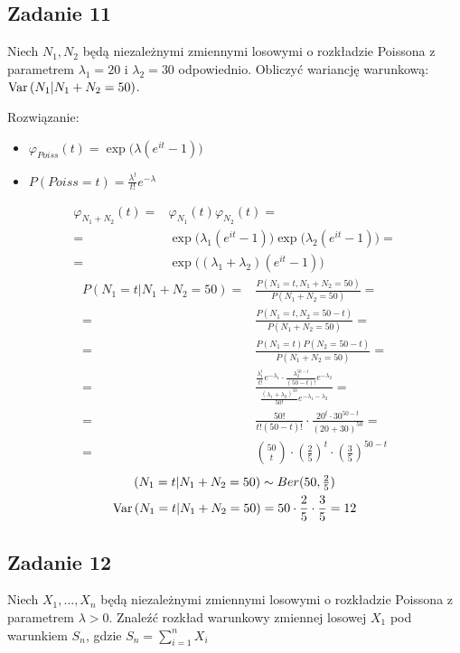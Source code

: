 \subsection*{Zadanie 11}
Niech $ N_1,N_2 $ będą niezależnymi zmiennymi losowymi o rozkładzie Poissona z parametrem $ \lambda_1=20$ i $ \lambda_2=30 $ odpowiednio. Obliczyć wariancję warunkową: $ \text{Var}\left(N_1|N_1+N_2=50\right) $.

Rozwiązanie:
\begin{itemize}
\item $ \varphi_{Poiss}(t)=\exp \bigl(\lambda(e^{it}-1)\bigr) $
\item $ P\left(Poiss=t\right)=\frac{\lambda^t}{t!}e^{-\lambda} $
\end{itemize}
\begin{align*}
\varphi_{N_1+N_2}(t)
=&
\varphi_{N_1}(t)\varphi_{N_2}(t)
=\\=&
\exp \bigl(\lambda_1(e^{it}-1)\bigr)\exp \bigl(\lambda_2(e^{it}-1)\bigr)
=\\=&
\exp \bigl(\left(\lambda_1+\lambda_2\right)(e^{it}-1)\bigr)
\end{align*}
\begin{align*}
P \left(N_1=t|N_1+N_2=50\right)
=&
\frac{P\left(N_1=t,N_1+N_2=50\right)}{P\left(N_1+N_2=50\right)}
=\\=&
\frac{P\left(N_1=t,N_2=50-t\right)}{P\left(N_1+N_2=50\right)}
=\\=&
\frac{P\left(N_1=t\right) P\left(N_2=50-t\right)}{P\left(N_1+N_2=50\right)}
=\\=&
\frac{\frac{\lambda_1^t}{t!}e^{-\lambda_1}
\cdot
\frac{\lambda_2^{50-t}}{(50-t)!}e^{-\lambda_2}}{\frac{(\lambda_1+\lambda_2)^{50}}{50!}e^{-\lambda_1-\lambda_2}}
=\\=&
\frac{50!}{t!(50-t)!}\cdot \frac{20^t\cdot30^{50-t}}{(20+30)^{50}}
=\\=&
\binom{50}{t}\cdot \left(\frac{2}{5}\right)^t\cdot \left(\frac{3}{5}\right)^{50-t}
\end{align*}
\begin{gather*}
\left(N_1=t|N_1+N_2=50\right)\sim Ber(50,\tfrac{2}{5})\\
\text{Var}\left(N_1=t|N_1+N_2=50\right)=
50\cdot\frac{2}{5}\cdot\frac{3}{5}=12
\end{gather*}


\subsection*{Zadanie 12}
Niech $ X_1,\dots,X_n$ będą niezależnymi zmiennymi losowymi o rozkładzie Poissona z parametrem $ \lambda>0 $. Znaleźć rozkład warunkowy zmiennej losowej $ X_1 $ pod warunkiem $ S_n $, gdzie $ S_n=\sum_{i=1}^{n}X_i $

